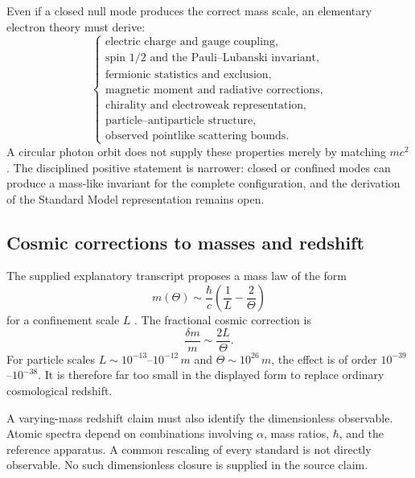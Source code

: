 \documentclass[11pt]{article}
\begin{document}
Even if a closed null mode produces the correct mass scale, an elementary electron theory must derive:
\begin{equation}
\left\{
\begin{array}{l}
\text{electric charge and gauge coupling},\\
\text{spin }1/2\text{ and the Pauli--Lubanski invariant},\\
\text{fermionic statistics and exclusion},\\
\text{magnetic moment and radiative corrections},\\
\text{chirality and electroweak representation},\\
\text{particle--antiparticle structure},\\
\text{observed pointlike scattering bounds}.
\end{array}
\right.
\end{equation}
A circular photon orbit does not supply these properties merely by matching \(mc^{2}\). The disciplined positive statement is narrower: closed or confined modes can produce a mass-like invariant for the complete configuration, and the derivation of the Standard Model representation remains open.

\subsection{Cosmic corrections to masses and redshift}

The supplied explanatory transcript proposes a mass law of the form
\begin{equation}
    m(\Theta)
    \sim \frac{\hbar}{c}
    \left(\frac{1}{L}-\frac{2}{\Theta}\right)
    \label{eq:cosmic_mass_correction}
\end{equation}
for a confinement scale \(L\) \cite{McCullochTranscript2026}. The fractional cosmic correction is
\begin{equation}
    \frac{\delta m}{m}\sim\frac{2L}{\Theta}.
\end{equation}
For particle scales \(L\sim10^{-13}\)--\(10^{-12}\,\si{m}\) and \(\Theta\sim10^{26}\,\si{m}\), the effect is of order \(10^{-39}\)--\(10^{-38}\). It is therefore far too small in the displayed form to replace ordinary cosmological redshift.

A varying-mass redshift claim must also identify the dimensionless observable. Atomic spectra depend on combinations involving \(\alpha\), mass ratios, \(\hbar\), and the reference apparatus. A common rescaling of every standard is not directly observable. No such dimensionless closure is supplied in the source claim.
\end{document}
